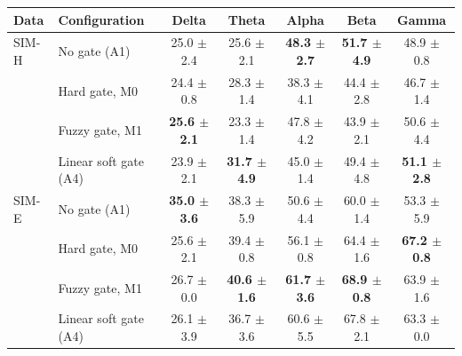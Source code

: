 \begin{tabular}{@{}llccccc@{}}
\toprule
Data & Configuration & Delta & Theta & Alpha & Beta & Gamma\\
\midrule
SIM-H & No gate (A1) & 25.0 $\pm$ 2.4 & 25.6 $\pm$ 2.1 & \textbf{48.3 $\pm$ 2.7} & \textbf{51.7 $\pm$ 4.9} & 48.9 $\pm$ 0.8\\
 & Hard gate, M0 & 24.4 $\pm$ 0.8 & 28.3 $\pm$ 1.4 & 38.3 $\pm$ 4.1 & 44.4 $\pm$ 2.8 & 46.7 $\pm$ 1.4\\
 & Fuzzy gate, M1 & \textbf{25.6 $\pm$ 2.1} & 23.3 $\pm$ 1.4 & 47.8 $\pm$ 4.2 & 43.9 $\pm$ 2.1 & 50.6 $\pm$ 4.4\\
 & Linear soft gate (A4) & 23.9 $\pm$ 2.1 & \textbf{31.7 $\pm$ 4.9} & 45.0 $\pm$ 1.4 & 49.4 $\pm$ 4.8 & \textbf{51.1 $\pm$ 2.8}\\
\midrule
SIM-E & No gate (A1) & \textbf{35.0 $\pm$ 3.6} & 38.3 $\pm$ 5.9 & 50.6 $\pm$ 4.4 & 60.0 $\pm$ 1.4 & 53.3 $\pm$ 5.9\\
 & Hard gate, M0 & 25.6 $\pm$ 2.1 & 39.4 $\pm$ 0.8 & 56.1 $\pm$ 0.8 & 64.4 $\pm$ 1.6 & \textbf{67.2 $\pm$ 0.8}\\
 & Fuzzy gate, M1 & 26.7 $\pm$ 0.0 & \textbf{40.6 $\pm$ 1.6} & \textbf{61.7 $\pm$ 3.6} & \textbf{68.9 $\pm$ 0.8} & 63.9 $\pm$ 1.6\\
 & Linear soft gate (A4) & 26.1 $\pm$ 3.9 & 36.7 $\pm$ 3.6 & 60.6 $\pm$ 5.5 & 67.8 $\pm$ 2.1 & 63.3 $\pm$ 0.0\\
\bottomrule
\end{tabular}
